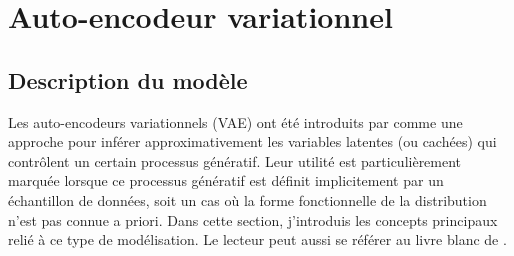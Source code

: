\section{Auto-encodeur variationnel}
 
\subsection{Description du modèle}

Les auto-encodeurs variationnels (VAE) ont été introduits par \citet{Kingma2013} comme une approche 
pour inférer approximativement les variables latentes (ou cachées) qui contrôlent un certain processus génératif. 
Leur utilité est particulièrement marquée lorsque ce processus génératif est définit implicitement par un échantillon de données, 
soit un cas où la forme fonctionnelle de la distribution n'est pas connue a priori.
Dans cette section, j'introduis 
les concepts principaux relié à ce type de modélisation. 
Le lecteur peut aussi se référer au livre blanc de \citet{Kingma2019}.

